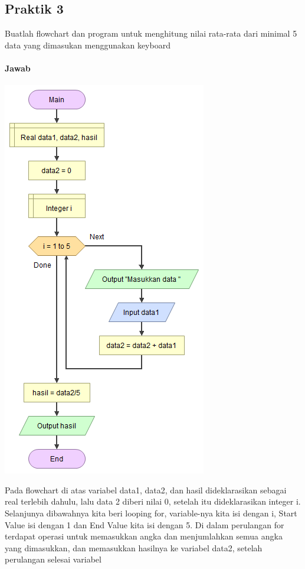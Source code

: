 \documentclass[a4paper,12pt]{article}
\begin{document}
\newpage
\subsection{Praktik 3}
Buatlah flowchart dan program untuk menghitung nilai rata-rata dari minimal 5 data yang dimasukan menggunakan keyboard
\paragraph{Jawab}
\begin{center}
    \includegraphics[scale = 0.8]{praktik3 - Main.png}
\end{center}
Pada flowchart di atas variabel data1, data2, dan hasil dideklarasikan sebagai real terlebih dahulu, lalu data 2 diberi nilai 0, setelah itu dideklarasikan integer i. 
Selanjunya dibawahnya kita beri looping for, variable-nya kita isi dengan i, Start Value isi dengan 1 dan End Value kita isi dengan 5.
Di dalam perulangan for terdapat operasi untuk memasukkan angka dan menjumlahkan semua angka yang dimasukkan, dan memasukkan hasilnya ke variabel data2, setelah perulangan selesai variabel
\end{document}
